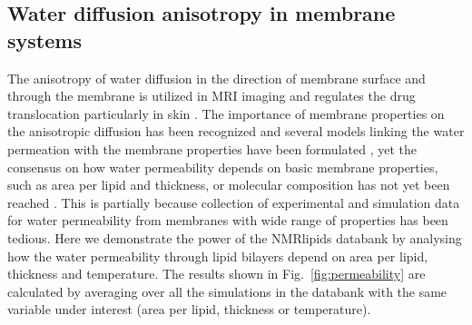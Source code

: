 \documentclass[fleqn,10pt]{wlscirep}
\begin{document}
\subsection{Water diffusion anisotropy in membrane systems}
The anisotropy of water diffusion in the direction of membrane surface and through the membrane is utilized in MRI imaging \cite{??} and regulates the drug translocation particularly in skin \cite{hansen13,wen18,nitsche19,roberts21,??}. The importance of membrane properties on the anisotropic diffusion has been recognized and several models linking the water permeation with the membrane properties have been formulated \cite{??}, yet the consensus on how water permeability depends on basic membrane properties, such as area per lipid and thickness, or molecular composition has not yet been reached \cite{nitsche13,nitsche16,shinoda16,venable19,??}. 
This is partially because collection of experimental and simulation data for water permeability from membranes with
wide range of properties has been tedious.
Here we demonstrate the power of the NMRlipids databank by analysing how the water permeability through lipid bilayers depend
on area per lipid, thickness and temperature. The results shown in Fig.~\ref{fig:permeability} are calculated by averaging over
all the simulations in the databank with the same variable under interest (area per lipid, thickness or temperature).
\end{document}
